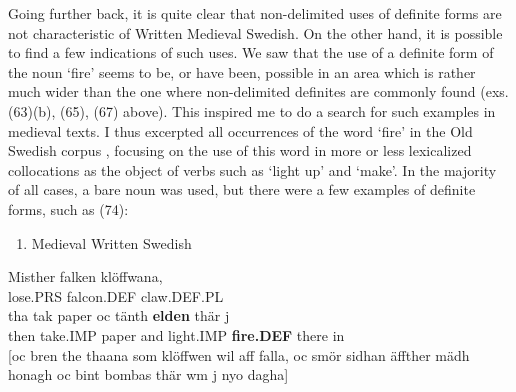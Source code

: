 Going further back, it is quite clear that non-delimited uses of definite forms are not characteristic of Written Medieval Swedish. On the other hand, it is possible to find a few indications of such uses. We saw that the use of a definite form of the noun  ‘fire’ seems to be, or have been, possible in an area which is rather much wider than the one where non-delimited definites are commonly found (exs. (63)(b), (65), (67) above). This inspired me to do a search for such examples in medieval texts. I thus excerpted all occurrences of the word  ‘fire’ in the Old Swedish corpus , focusing on the use of this word in more or less lexicalized collocations as the object of verbs such as  ‘light up’ and  ‘make’. In the majority of all cases, a bare noun was used, but there were a few examples of definite forms, such as (74):

\begin{enumerate} %
\item 
\label{bkm:Ref64457141}Medieval Written Swedish

\end{enumerate} %
\ea\label{}
\gll Misther  falken  klöffwana,\\


lose.PRS  falcon.DEF  claw.DEF.PL\\ %


\ea\label{}
\gll tha  tak  paper  oc  tänth  \textbf{elden}  thär  j\\


then  take.IMP  paper  and  light.IMP  \textbf{fire.DEF} there   in\\ %


[oc bren the thaana som klöffwen wil aff falla, oc smör sidhan äffther mädh honagh oc bint bombas thär wm j nyo dagha]


